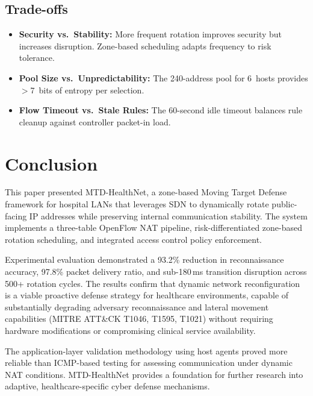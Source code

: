 \documentclass[conference]{IEEEtran}
\begin{document}
\subsection{Trade-offs}

\begin{itemize}
    \item \textbf{Security vs.\ Stability:} More frequent rotation improves security but increases disruption. Zone-based scheduling adapts frequency to risk tolerance.
    \item \textbf{Pool Size vs.\ Unpredictability:} The 240-address pool for 6~hosts provides $>$7~bits of entropy per selection.
    \item \textbf{Flow Timeout vs.\ Stale Rules:} The 60-second idle timeout balances rule cleanup against controller packet-in load.
\end{itemize}

\section{Conclusion}

This paper presented MTD-HealthNet, a zone-based Moving Target Defense framework for hospital LANs that leverages SDN to dynamically rotate public-facing IP addresses while preserving internal communication stability. The system implements a three-table OpenFlow NAT pipeline, risk-differentiated zone-based rotation scheduling, and integrated access control policy enforcement.

Experimental evaluation demonstrated a 93.2\% reduction in reconnaissance accuracy, 97.8\% packet delivery ratio, and sub-180\,ms transition disruption across 500+ rotation cycles. The results confirm that dynamic network reconfiguration is a viable proactive defense strategy for healthcare environments, capable of substantially degrading adversary reconnaissance and lateral movement capabilities (MITRE ATT\&CK T1046, T1595, T1021) without requiring hardware modifications or compromising clinical service availability.

The application-layer validation methodology using host agents proved more reliable than ICMP-based testing for assessing communication under dynamic NAT conditions. MTD-HealthNet provides a foundation for further research into adaptive, healthcare-specific cyber defense mechanisms.

\end{document}
